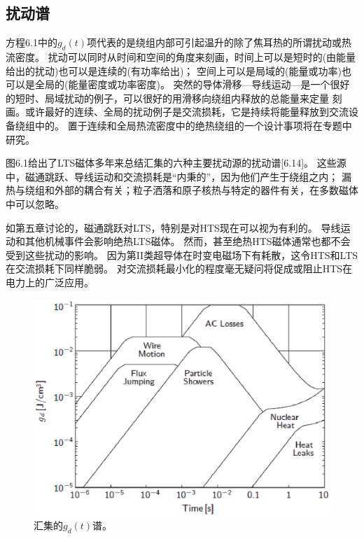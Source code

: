 \subsection{扰动谱}
方程6.1中的$g_d(t)$项代表的是绕组内部可引起温升的除了焦耳热的所谓扰动或热流密度。
扰动可以同时从时间和空间的角度来刻画，时间上可以是短时的(由能量给出的扰动)也可以是连续的(有功率给出)；
空间上可以是局域的(能量或功率)也可以是全局的(能量密度或功率密度)。
突然的导体滑移---导线运动---是一个很好的短时、局域扰动的例子，可以很好的用滑移向绕组内释放的总能量来定量
刻画。或许最好的连续、全局的扰动例子是交流损耗，它是持续将能量释放到交流设备绕组中的。
置于连续和全局热流密度中的绝热绕组的一个设计事项将在专题中研究。

图6.1给出了LTS磁体多年来总结汇集的六种主要扰动源的扰动谱[6.14]。
这些源中，磁通跳跃、导线运动和交流损耗是“内秉的”，因为他们产生于绕组之内；
漏热与绕组和外部的耦合有关；粒子洒落和原子核热与特定的器件有关，在多数磁体中可以忽略。

如第五章讨论的，磁通跳跃对LTS，特别是对HTS现在可以视为有利的。
导线运动和其他机械事件会影响绝热LTS磁体。
然而，甚至绝热HTS磁体通常也都不会受到这些扰动的影响。
因为第II类超导体在时变电磁场下有耗散，这令HTS和LTS在交流损耗下同样脆弱。
对交流损耗最小化的程度毫无疑问将促成或阻止HTS在电力上的广泛应用。

\begin{figure}[htbp]
	\centering
	\includegraphics[scale=0.7]{chpt6/figs/fig6.1.eps}
	\caption{汇集的$g_d(t)$谱。}
\end{figure}

